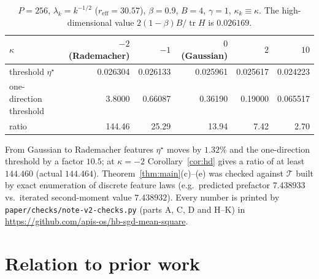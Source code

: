 \documentclass[11pt]{article}
\newcommand{\tr}{\operatorname{tr}}
\newcommand{\T}{\mathcal T}
\begin{document}
\begin{table}[!ht]
\centering
\caption{$P=256$, $\lambda_k=k^{-1/2}$ ($r_{\mathrm{eff}}=30.57$), $\beta=0.9$, $B=4$, $\gamma=1$, $\kappa_k\equiv\kappa$. The high-dimensional value $2(1-\beta)B/\tr H$ is $0.026169$.}
\label{tab:1d}
\smallskip
{\small\begin{tabular}{lrrrrr}
\toprule
$\kappa$ & $-2$ (Rademacher) & $-1$ & $0$ (Gaussian) & $2$ & $10$\\
\midrule
threshold $\eta^\star$ & 0.026304 & 0.026133 & 0.025961 & 0.025617 & 0.024223\\
one-direction threshold & 3.8000 & 0.66087 & 0.36190 & 0.19000 & 0.065517\\
ratio & 144.46 & 25.29 & 13.94 & 7.42 & 2.70\\
\bottomrule
\end{tabular}}
\end{table}

From Gaussian to Rademacher features $\eta^\star$ moves by $1.32\%$ and the one-direction threshold by a factor $10.5$; at $\kappa=-2$ Corollary~\ref{cor:hd} gives a ratio of at least $144.460$ (actual $144.464$). Theorem~\ref{thm:main}(c)--(e) was checked against $\T$ built by exact enumeration of discrete feature laws (e.g.\ predicted prefactor $7.438933$ vs.\ iterated second-moment value $7.438932$). Every number is printed by \texttt{paper/checks/note-v2-checks.py} (parts A, C, D and H--K) in \url{https://github.com/apis-os/hb-sgd-mean-square}.

\section{Relation to prior work}
\end{document}
